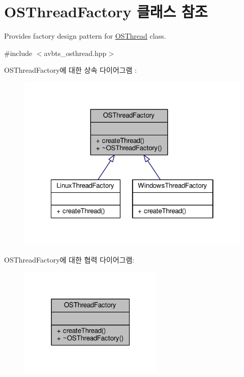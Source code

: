 \hypertarget{class_o_s_thread_factory}{}\section{O\+S\+Thread\+Factory 클래스 참조}
\label{class_o_s_thread_factory}


Provides factory design pattern for \hyperlink{class_o_s_thread}{O\+S\+Thread} class.  




{\ttfamily \#include $<$avbts\+\_\+osthread.\+hpp$>$}



O\+S\+Thread\+Factory에 대한 상속 다이어그램 \+: 
\nopagebreak
\begin{figure}[H]
\begin{center}
\leavevmode
\includegraphics[width=322pt]{class_o_s_thread_factory__inherit__graph}
\end{center}
\end{figure}


O\+S\+Thread\+Factory에 대한 협력 다이어그램\+:
\nopagebreak
\begin{figure}[H]
\begin{center}
\leavevmode
\includegraphics[width=195pt]{class_o_s_thread_factory__coll__graph}
\end{center}
\end{figure}
